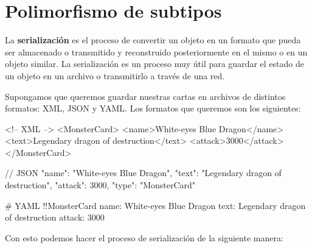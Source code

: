 \section{Polimorfismo de subtipos}
  \label{sec:oop:principios:clases_abstractas}

  La \textbf{serialización} es el proceso de convertir un objeto en un formato que pueda ser
  almacenado o transmitido y reconstruido posteriormente en el mismo o en un objeto similar.
  La serialización es un proceso muy útil para guardar el estado de un objeto en un archivo o
  transmitirlo a través de una red.

  Supongamos que queremos guardar nuestras cartas en archivos de distintos formatos: XML, JSON y
  YAML.
  Los formatos que queremos son los siguientes:

  \begin{xml}
    <!-- XML -->
    <MonsterCard>
      <name>White-eyes Blue Dragon</name>
      <text>Legendary dragon of destruction</text>
      <attack>3000</attack>
    </MonsterCard>
  \end{xml}

  \begin{json}
    // JSON
    {
      "name": "White-eyes Blue Dragon",
      "text": "Legendary dragon of destruction",
      "attack": 3000,
      "type": "MonsterCard"
    }
  \end{json}

  \begin{yaml}
    # YAML
    !!MonsterCard
    name: White-eyes Blue Dragon
    text: Legendary dragon of destruction
    attack: 3000
  \end{yaml}

  Con esto podemos hacer el proceso de serialización de la siguiente manera:


